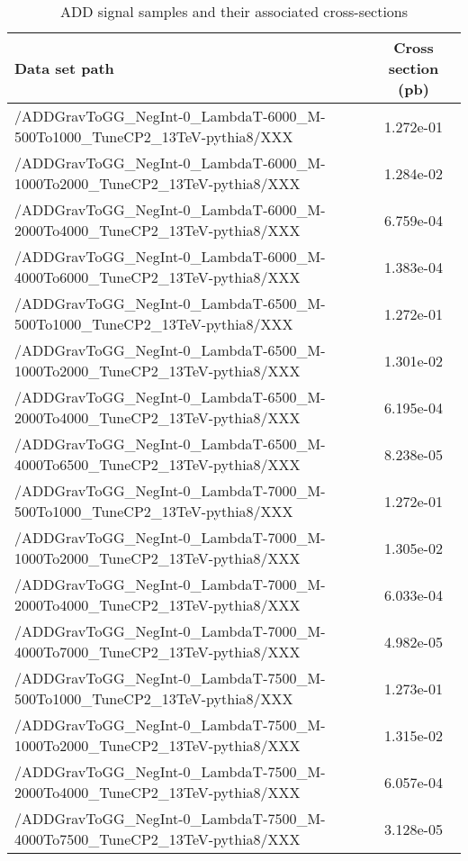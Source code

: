 \begin{landscape}
\begin{table}[!htbp]
       \caption{ ADD signal samples and their associated cross-sections }
       \centering
       \vspace{\baselineskip}
       \begin{tabular}{lc}
       \hline \hline
       Data set path & Cross section (pb)\\
       \hline
/ADDGravToGG\_NegInt-0\_LambdaT-6000\_M-500To1000\_TuneCP2\_13TeV-pythia8/XXX &  1.272e-01\\
/ADDGravToGG\_NegInt-0\_LambdaT-6000\_M-1000To2000\_TuneCP2\_13TeV-pythia8/XXX &  1.284e-02\\
/ADDGravToGG\_NegInt-0\_LambdaT-6000\_M-2000To4000\_TuneCP2\_13TeV-pythia8/XXX &  6.759e-04\\
/ADDGravToGG\_NegInt-0\_LambdaT-6000\_M-4000To6000\_TuneCP2\_13TeV-pythia8/XXX &  1.383e-04\\
/ADDGravToGG\_NegInt-0\_LambdaT-6500\_M-500To1000\_TuneCP2\_13TeV-pythia8/XXX &  1.272e-01\\
/ADDGravToGG\_NegInt-0\_LambdaT-6500\_M-1000To2000\_TuneCP2\_13TeV-pythia8/XXX &  1.301e-02\\
/ADDGravToGG\_NegInt-0\_LambdaT-6500\_M-2000To4000\_TuneCP2\_13TeV-pythia8/XXX &  6.195e-04\\
/ADDGravToGG\_NegInt-0\_LambdaT-6500\_M-4000To6500\_TuneCP2\_13TeV-pythia8/XXX &  8.238e-05\\
/ADDGravToGG\_NegInt-0\_LambdaT-7000\_M-500To1000\_TuneCP2\_13TeV-pythia8/XXX &  1.272e-01\\
/ADDGravToGG\_NegInt-0\_LambdaT-7000\_M-1000To2000\_TuneCP2\_13TeV-pythia8/XXX &  1.305e-02\\
/ADDGravToGG\_NegInt-0\_LambdaT-7000\_M-2000To4000\_TuneCP2\_13TeV-pythia8/XXX &  6.033e-04\\
/ADDGravToGG\_NegInt-0\_LambdaT-7000\_M-4000To7000\_TuneCP2\_13TeV-pythia8/XXX &  4.982e-05\\
/ADDGravToGG\_NegInt-0\_LambdaT-7500\_M-500To1000\_TuneCP2\_13TeV-pythia8/XXX &  1.273e-01\\
/ADDGravToGG\_NegInt-0\_LambdaT-7500\_M-1000To2000\_TuneCP2\_13TeV-pythia8/XXX &  1.315e-02\\
/ADDGravToGG\_NegInt-0\_LambdaT-7500\_M-2000To4000\_TuneCP2\_13TeV-pythia8/XXX &  6.057e-04\\
/ADDGravToGG\_NegInt-0\_LambdaT-7500\_M-4000To7500\_TuneCP2\_13TeV-pythia8/XXX &  3.128e-05\\

       \hline \hline
       \end{tabular}
       \label{table:ADD_signal_samples_xsec}
\end{table}
\end{landscape}

